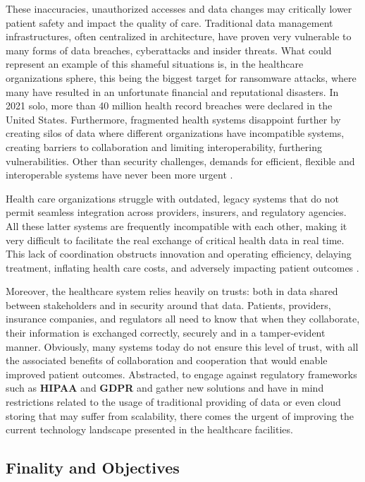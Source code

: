 These inaccuracies, unauthorized accesses and data changes may critically lower patient safety and impact 
the quality of care. Traditional data management infrastructures, often centralized in architecture, have proven 
very vulnerable to many forms of data breaches, cyberattacks and insider threats. What could represent an example 
of this shameful situations is, in the healthcare organizations sphere, this being the biggest target for 
ransomware attacks, where many have resulted in an unfortunate financial and reputational disasters. In 2021 solo,
more than 40 million health record breaches were declared in the United States. Furthermore, fragmented health 
systems disappoint further by creating silos of data where different organizations have incompatible systems, creating
barriers to collaboration and limiting interoperability, furthering vulnerabilities. Other than security 
challenges, demands for efficient, flexible and interoperable systems have never been more urgent \cite{data-breaches-2021} \cite{healthcare-privacy}.

Health care organizations struggle with outdated, legacy systems that do not permit seamless integration 
across providers, insurers, and regulatory agencies. All these latter systems are frequently incompatible 
with each other, making it very difficult to facilitate the real exchange of critical health data in real time. 
This lack of coordination obstructs innovation and operating efficiency, delaying treatment, inflating health 
care costs, and adversely impacting patient outcomes \cite{legacy-healthcare}.

Moreover, the healthcare system relies heavily on trusts: both in data shared between stakeholders and in 
security around that data. Patients, providers, insurance companies, and regulators all need to know that when 
they collaborate, their information is exchanged correctly, securely and in a tamper-evident manner. Obviously, 
many systems today do not ensure this level of trust, with all the associated benefits of collaboration and 
cooperation that would enable improved patient outcomes. Abstracted, to engage against regulatory frameworks 
such as \textbf{HIPAA} and \textbf{GDPR} and gather new solutions and have in mind restrictions related to the 
usage of traditional providing of data or even cloud storing that may suffer from scalability,  there comes the 
urgent of improving the current technology landscape presented in the healthcare facilities.

\subsection{Finality and Objectives}

